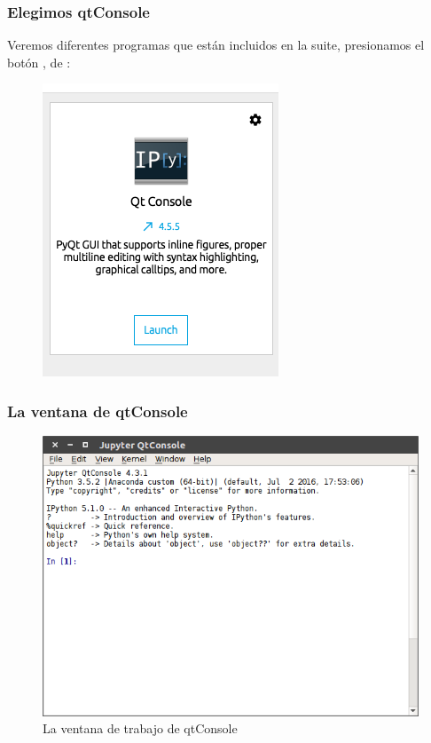 \documentclass[12pt]{beamer}
\begin{document}
{\begin{frame}
\frametitle{Elegimos qtConsole}
Veremos diferentes programas que están incluidos en la suite, presionamos el botón , de :
\begin{figure}
	\centering
	\includegraphics[scale=0.35]{Figuras/qtConsole_00.png}
\end{figure}
\end{frame}
\begin{frame}
\frametitle{La ventana de qtConsole}
\begin{figure}
	\centering
	\includegraphics[scale=0.35]{Figuras/qtConsole_01.png}
	\caption{La ventana de trabajo de qtConsole}
\end{figure}
\end{frame}
}
\end{document}
